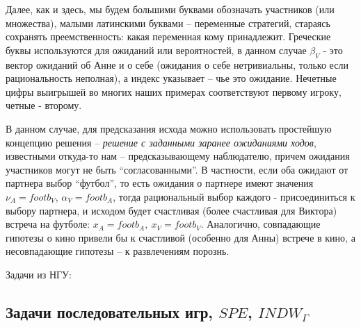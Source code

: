 \documentclass[a4paper,12pt]{article}
\begin{document}
\begin{exmp}
{{\small Далее, как и здесь, мы будем большими буквами
обозначать участников (или множества), малыми латинскими
буквами -- переменные стратегий, стараясь сохранять
преемственность: какая переменная кому принадлежит.
Греческие буквы используются для ожиданий или вероятностей,
в данном случае  $\beta_V$ - это вектор ожиданий об Анне и
о себе (ожидания о себе нетривиальны, только если
рациональность неполная), а индекс указывает -- чье это
ожидание. Нечетные цифры выигрышей во многих наших примерах
соответствуют первому игроку, четные -
второму.}\vspace{2mm}

В данном случае, для предсказания исхода можно использовать
простейшую концепцию решения -- {\em решение с заданными заранее
ожиданиями ходов}, известными откуда-то нам -- предсказывающему
наблюдателю, причем ожидания участников могут не быть
``согласованными''. В частности, если оба ожидают от партнера
выбор ``футбол'', то есть ожидания о партнере имеют значения
$\nu_A=footb_V$, $\alpha_V=footb_A$,
тогда рациональный выбор каждого - присоединиться к выбору
партнера, и исходом будет счастливая (более счастливая для
Виктора) встреча на футболе: $x_A=footb_A,~x_V=footb_V$.
Аналогично, совпадающие гипотезы о кино привели бы к счастливой
(особенно для Анны) встрече в кино, а несовпадающие гипотезы --
к развлечениям порознь.

}\end{exmp}


{\Large Задачи из НГУ:}




\subsection{Задачи последовательных игр, $SPE$, $INDW_{\Gamma}$}
\end{document}
